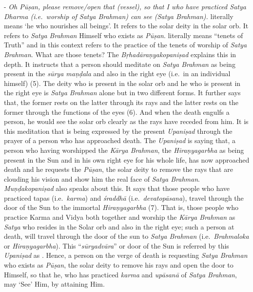 - \emph{Oh Pūṣan, please remove/open that (vessel), so that I who have practiced Satya Dharma (i.e.\ worship of Satya Brahman) can see (Satya Brahman).}  literally means `he who nourishes all beings'. It refers to the solar deity in the solar orb. It refers to \emph{Satya Brahman} Himself who exists as \emph{Pūṣan}.  literally means ``tenets of Truth'' and in this context refers to the practice of the tenets of worship of \emph{Satya Brahman}. What are those tenets? The \emph{Bṛhadāraṇyakopaniṣad} explains this in depth. It instructs that a person should meditate on \emph{Satya Brahman} as being present in the \emph{sūrya maṇḍala} and also in the right eye (i.e.\ in an individual himself) (5). The deity who is present in the solar orb and he who is present in the right eye is \emph{Satya Brahman} alone but in two different forms. It further says that, the former rests on the latter through its rays and the latter rests on the former through the functions of the eyes (6). And when the death engulfs a person, he would see the solar orb clearly as the rays have receded from him. It is this meditation that is being expressed by the present \emph{Upaniṣad} through the prayer of a person who has approached death. The \emph{Upaniṣad} is saying that, a person who having worshipped the \emph{Kārya Brahman}, the \emph{Hiraṇyagarbha} as being present in the Sun and in his own right eye for his whole life, has now approached death and he requests the \emph{Pūṣan}, the solar deity to remove the rays that are clouding his vision and show him the real face of \emph{Satya Brahman}. \emph{Muṇḍakopaniṣad} also speaks about this. It says that those people who have practiced tapas (i.e.\ \emph{karma}) and \emph{śraddhā} (i.e.\ \emph{devatopāsana}), travel through the door of the Sun to the immortal \emph{Hiraṇyagarbha} (7). That is, those people who practice Karma and Vidya both together and worship the \emph{Kārya Brahman} as \emph{Satya} who resides in the Solar orb and also in the right eye; such a person at death, will travel through the door of the sun to \emph{Satya Brahman} (i.e.\ \emph{Brahmaloka} or \emph{Hiraṇyagarbha}). This ``\emph{sūryadvāra}'' or door of the Sun is referred by this \emph{Upaniṣad} as . Hence, a person on the verge of death is requesting \emph{Satya Brahman} who exists as \emph{Pūṣan}, the solar deity to remove his rays and open the door to Himself, so that he, who has practiced \emph{karma} and \emph{upāsanā} of \emph{Satya Brahman}, may `See' Him, by attaining Him.

